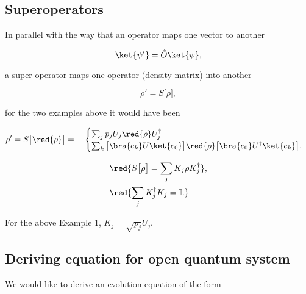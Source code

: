 \subsection{Superoperators}
In parallel with the way that an operator maps one vector to another

\begin{equation}
  \ket{\psi'}=\hat{O}\ket{\psi},
\end{equation}

\noindent  a super-operator  maps  one operator  (density matrix)  into
another

\begin{equation}
  \rho'=S\big[\rho\big],
\end{equation}

\noindent for the two examples above it would have been

\begin{equation}
  \rho' = S\big[\red{\rho}\big] = \quad
  \begin{cases}
    \sum_jp_jU_j\red{\rho} U_j^\dagger\\
    \sum_k\big[\bra{e_k}U\ket{e_0}\big]\red{\rho}\big[\bra{e_0}
    U^\dagger\ket{e_k}\big].
  \end{cases}
\end{equation}

\noindent{}

\begin{equation}
  \begin{aligned}
    & \red{S\big[\rho\big] = \sum_jK_j\rho K_j^\dagger},\\
    & \red{\sum_jK_j^\dagger K_j = \mathbb{I}.}
  \end{aligned}
\end{equation}

\noindent For the above Example 1, $K_j = \sqrt{p_j}U_j$.


\subsection{Deriving equation for open quantum system}
We would like to derive an evolution equation of the form

